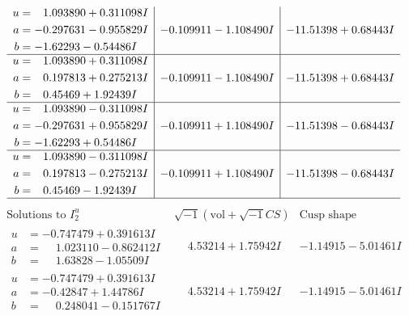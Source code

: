 \documentclass[1p]{elsarticle_modified}
\theoremstyle{definition}
\newcommand{\I}{\sqrt{-1}}
\begin{document}
$$\begin{array}{c|c|c}
\begin{aligned}
u &= \phantom{-}1.093890 + 0.311098 I \\
a &= -0.297631 - 0.955829 I \\
b &= -1.62293 - 0.54486 I\end{aligned}
 & -0.109911 - 1.108490 I & -11.51398 + 0.68443 I \\ \hline\begin{aligned}
u &= \phantom{-}1.093890 + 0.311098 I \\
a &= \phantom{-}0.197813 + 0.275213 I \\
b &= \phantom{-}0.45469 + 1.92439 I\end{aligned}
 & -0.109911 - 1.108490 I & -11.51398 + 0.68443 I \\ \hline\begin{aligned}
u &= \phantom{-}1.093890 - 0.311098 I \\
a &= -0.297631 + 0.955829 I \\
b &= -1.62293 + 0.54486 I\end{aligned}
 & -0.109911 + 1.108490 I & -11.51398 - 0.68443 I \\ \hline\begin{aligned}
u &= \phantom{-}1.093890 - 0.311098 I \\
a &= \phantom{-}0.197813 - 0.275213 I \\
b &= \phantom{-}0.45469 - 1.92439 I\end{aligned}
 & -0.109911 + 1.108490 I & -11.51398 - 0.68443 I\\
 \hline 
 \end{array}$$\newpage$$\begin{array}{c|c|c}  
\text{Solutions to }I^u_{2}& \I (\text{vol} + \sqrt{-1}CS) & \text{Cusp shape}\\
 \hline 
\begin{aligned}
u &= -0.747479 + 0.391613 I \\
a &= \phantom{-}1.023110 - 0.862412 I \\
b &= \phantom{-}1.63828 - 1.05509 I\end{aligned}
 & \phantom{-}4.53214 + 1.75942 I & -1.14915 - 5.01461 I \\ \hline\begin{aligned}
u &= -0.747479 + 0.391613 I \\
a &= -0.42847 + 1.44786 I \\
b &= \phantom{-}0.248041 - 0.151767 I\end{aligned}
 & \phantom{-}4.53214 + 1.75942 I & -1.14915 - 5.01461 I \\ \hline\begin{aligned}

\end{aligned}
\end{array}$$
\end{document}
